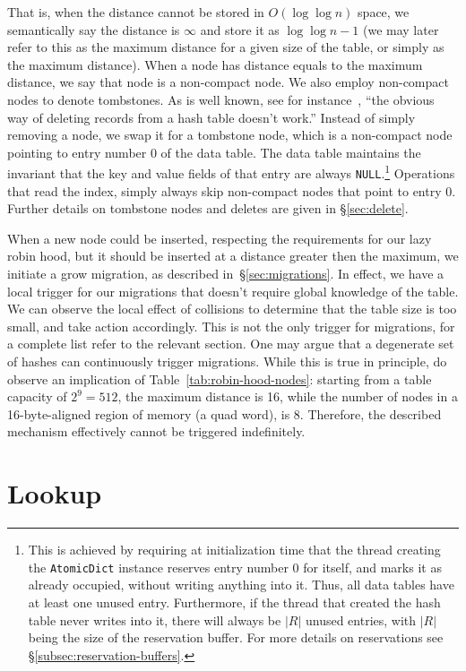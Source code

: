 That is, when the distance cannot be stored in $O(\log \log n)$ space, we semantically say the distance is $\infty$ and store it as $\log \log n - 1$ (we may later refer to this as the maximum distance for a given size of the table, or simply as the maximum distance).
When a node has distance equals to the maximum distance, we say that node is a non-compact node.
We also employ non-compact nodes to denote tombstones.
As is well known, see for instance~\cite[\S6.4]{the-art-vol-2}, ``the obvious way of deleting records from a hash table doesn't work.''
Instead of simply removing a node, we swap it for a tombstone node, which is a non-compact node pointing to entry number 0 of the data table.
The data table maintains the invariant that the key and value fields of that entry are always \texttt{NULL}.\footnote{%
	This is achieved by requiring at initialization time that the thread creating the \texttt{AtomicDict} instance reserves entry number 0 for itself, and marks it as already occupied, without writing anything into it.
	Thus, all data tables have at least one unused entry.
	Furthermore, if the thread that created the hash table never writes into it, there will always be $|R|$ unused entries, with $|R|$ being the size of the reservation buffer.
	For more details on reservations see \S\ref{subsec:reservation-buffers}.
}
Operations that read the index, simply always skip non-compact nodes that point to entry 0.
Further details on tombstone nodes and deletes are given in \S\ref{sec:delete}.

When a new node could be inserted, respecting the requirements for our lazy robin hood, but it should be inserted at a distance greater then the maximum, we initiate a grow migration, as described in~\S\ref{sec:migrations}.
In effect, we have a local trigger for our migrations that doesn't require global knowledge of the table.
We can observe the local effect of collisions to determine that the table size is too small, and take action accordingly.
This is not the only trigger for migrations, for a complete list refer to the relevant section.
One may argue that a degenerate set of hashes can continuously trigger migrations.
While this is true in principle, do observe an implication of Table~\ref{tab:robin-hood-nodes}: starting from a table capacity of $2^9 = 512$, the maximum distance is 16, while the number of nodes in a 16-byte-aligned region of memory (a quad word), is 8.
Therefore, the described mechanism effectively cannot be triggered indefinitely.


\section{Lookup}\label{sec:lookup}

